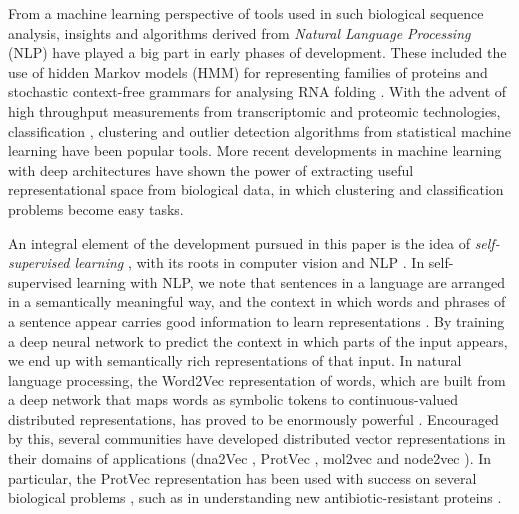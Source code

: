 \documentclass[10pt,journal,compsoc,twoside]{IEEEtran}
\begin{document}
From a machine learning perspective of tools used in such biological sequence analysis, insights and algorithms derived from \textit{Natural Language Processing} (NLP) \cite{nlp_fundamentals} have played a big part in early phases of development. These included the use of hidden Markov models (HMM) for representing families of proteins and stochastic context-free grammars for analysing RNA folding \cite{durbin}. With the advent of high throughput measurements from transcriptomic and proteomic technologies, classification \cite{haussler-pnas-paper}, clustering \cite{spellman} and outlier detection algorithms \cite{gunawardana_outlier} from statistical machine learning have been popular tools. More recent developments in machine learning with deep architectures \cite{deep-genomics-review,barash_splicing,jaganathan_2019} have shown the power of extracting useful representational space from biological data, in which clustering and classification problems become easy tasks.

An integral element of the development pursued in this paper is the idea of \textit{self-supervised learning} \cite{representation-learning}, with its roots in computer vision \cite{imagenet_2015} and NLP \cite{nlp_fundamentals}. In self-supervised learning with NLP, we note that sentences in a language are arranged in a semantically meaningful way, and the context in which words and phrases of a sentence appear carries good information to learn representations \cite{representation-learning}. By training a deep neural network to predict the context in which parts of the input appears, we end up with semantically rich representations of that input. In natural language processing, the Word2Vec \cite{mikolov2013-original} representation of words, which are built from a deep network that maps words as symbolic tokens to continuous-valued distributed representations, has proved to be enormously powerful \cite{mikolov2013_2nd}. Encouraged by this, several communities have developed distributed vector representations in their domains of applications (dna2Vec \cite{dna2vec}, ProtVec \cite{protvec}, mol2vec \cite{mol2vec} and node2vec \cite{node2vec}). In particular, the ProtVec representation has been used with success on several biological problems \cite{protvec,tape}, such as in understanding new antibiotic-resistant proteins \cite{tape}.
\end{document}
